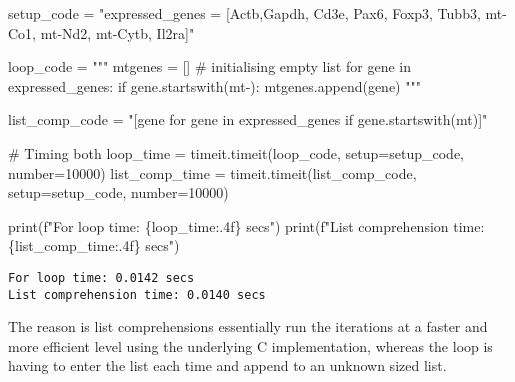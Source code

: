 \documentclass[
  letterpaper,
  DIV=11,
  numbers=noendperiod]{scrartcl}
\newenvironment{Shaded}{\begin{snugshade}}{\end{snugshade}}
\newcommand{\BuiltInTok}[1]{\textcolor[rgb]{0.00,0.23,0.31}{#1}}
\newcommand{\CommentTok}[1]{\textcolor[rgb]{0.37,0.37,0.37}{#1}}
\newcommand{\DecValTok}[1]{\textcolor[rgb]{0.68,0.00,0.00}{#1}}
\newcommand{\NormalTok}[1]{\textcolor[rgb]{0.00,0.23,0.31}{#1}}
\newcommand{\OperatorTok}[1]{\textcolor[rgb]{0.37,0.37,0.37}{#1}}
\newcommand{\SpecialCharTok}[1]{\textcolor[rgb]{0.37,0.37,0.37}{#1}}
\newcommand{\SpecialStringTok}[1]{\textcolor[rgb]{0.13,0.47,0.30}{#1}}
\newcommand{\StringTok}[1]{\textcolor[rgb]{0.13,0.47,0.30}{#1}}
\begin{document}
\begin{Shaded}
\begin{Highlighting}[]
\NormalTok{setup\_code }\OperatorTok{=} \StringTok{"expressed\_genes = [\textquotesingle{}Actb\textquotesingle{},\textquotesingle{}Gapdh\textquotesingle{}, \textquotesingle{}Cd3e\textquotesingle{}, \textquotesingle{}Pax6\textquotesingle{}, \textquotesingle{}Foxp3\textquotesingle{}, \textquotesingle{}Tubb3\textquotesingle{}, \textquotesingle{}mt{-}Co1\textquotesingle{}, \textquotesingle{}mt{-}Nd2\textquotesingle{}, \textquotesingle{}mt{-}Cytb\textquotesingle{}, \textquotesingle{}Il2ra\textquotesingle{}]"}

\NormalTok{loop\_code }\OperatorTok{=} \StringTok{"""}
\StringTok{mtgenes = [] \# initialising empty list}
\StringTok{for gene in expressed\_genes:}
\StringTok{  if gene.startswith(\textquotesingle{}mt{-}\textquotesingle{}):}
\StringTok{    mtgenes.append(gene)}
\StringTok{"""}

\NormalTok{list\_comp\_code }\OperatorTok{=} \StringTok{"[gene for gene in expressed\_genes if gene.startswith(\textquotesingle{}mt\textquotesingle{})]"}


\CommentTok{\# Timing both}
\NormalTok{loop\_time }\OperatorTok{=}\NormalTok{ timeit.timeit(loop\_code, setup}\OperatorTok{=}\NormalTok{setup\_code, number}\OperatorTok{=}\DecValTok{10000}\NormalTok{)}
\NormalTok{list\_comp\_time }\OperatorTok{=}\NormalTok{ timeit.timeit(list\_comp\_code, setup}\OperatorTok{=}\NormalTok{setup\_code, number}\OperatorTok{=}\DecValTok{10000}\NormalTok{)}

\BuiltInTok{print}\NormalTok{(}\SpecialStringTok{f"For loop time: }\SpecialCharTok{\{}\NormalTok{loop\_time}\SpecialCharTok{:.4f\}}\SpecialStringTok{ secs"}\NormalTok{)}
\BuiltInTok{print}\NormalTok{(}\SpecialStringTok{f"List comprehension time: }\SpecialCharTok{\{}\NormalTok{list\_comp\_time}\SpecialCharTok{:.4f\}}\SpecialStringTok{ secs"}\NormalTok{)}
\end{Highlighting}
\end{Shaded}

\begin{verbatim}
For loop time: 0.0142 secs
List comprehension time: 0.0140 secs
\end{verbatim}

The reason is list comprehensions essentially run the iterations at a
faster and more efficient level using the underlying C implementation,
whereas the loop is having to enter the list each time and append to an
unknown sized list.
\end{document}
